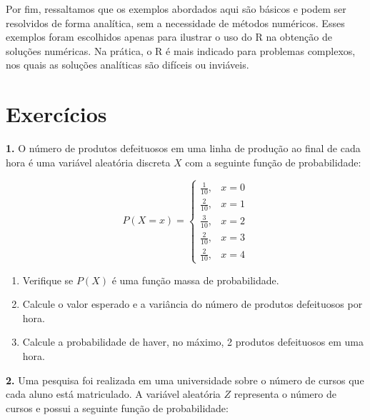 \documentclass[
]{book}
\newenvironment{Shaded}{\begin{snugshade}}{\end{snugshade}}
\newcommand{\DecValTok}[1]{\textcolor[rgb]{0.00,0.00,0.81}{#1}}
\newcommand{\DocumentationTok}[1]{\textcolor[rgb]{0.56,0.35,0.01}{\textbf{\textit{#1}}}}
\newcommand{\FunctionTok}[1]{\textcolor[rgb]{0.13,0.29,0.53}{\textbf{#1}}}
\newcommand{\NormalTok}[1]{#1}
\newcommand{\SpecialCharTok}[1]{\textcolor[rgb]{0.81,0.36,0.00}{\textbf{#1}}}
\begin{document}
\begin{Shaded}
\end{Shaded}

Por fim, ressaltamos que os exemplos abordados aqui são básicos e podem ser resolvidos de forma analítica, sem a necessidade de métodos numéricos. Esses exemplos foram escolhidos apenas para ilustrar o uso do R na obtenção de soluções numéricas. Na prática, o R é mais indicado para problemas complexos, nos quais as soluções analíticas são difíceis ou inviáveis.

\section{Exercícios}\label{exercuxedcios-22}

\textbf{1.} O número de produtos defeituosos em uma linha de produção ao final de cada hora é uma variável aleatória discreta \(X\) com a seguinte função de probabilidade:

\[P(X = x) =
\begin{cases}
\frac{1}{10}, & x = 0 \\
\frac{2}{10}, & x = 1 \\
\frac{3}{10}, & x = 2 \\
\frac{2}{10}, & x = 3 \\
\frac{2}{10}, & x = 4
\end{cases}\]

\begin{enumerate}
\def\labelenumi{(\alph{enumi})}
\item
  Verifique se \(P(X)\) é uma função massa de probabilidade.
\item
  Calcule o valor esperado e a variância do número de produtos defeituosos por hora.
\item
  Calcule a probabilidade de haver, no máximo, 2 produtos defeituosos em uma hora.
\end{enumerate}

\textbf{2.} Uma pesquisa foi realizada em uma universidade sobre o número de cursos que cada aluno está matriculado. A variável aleatória \(Z\) representa o número de cursos e possui a seguinte função de probabilidade:
\end{document}
